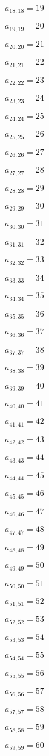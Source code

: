 \documentclass[a4paper,12pt]{article}
\begin{document}
$a _{ 18, 18 } = 19$

$a _{ 19, 19 } = 20$

$a _{ 20, 20 } = 21$

$a _{ 21, 21 } = 22$

$a _{ 22, 22 } = 23$

$a _{ 23, 23 } = 24$

$a _{ 24, 24 } = 25$

$a _{ 25, 25 } = 26$

$a _{ 26, 26 } = 27$

$a _{ 27, 27 } = 28$

$a _{ 28, 28 } = 29$

$a _{ 29, 29 } = 30$

$a _{ 30, 30 } = 31$

$a _{ 31, 31 } = 32$

$a _{ 32, 32 } = 33$

$a _{ 33, 33 } = 34$

$a _{ 34, 34 } = 35$

$a _{ 35, 35 } = 36$

$a _{ 36, 36 } = 37$

$a _{ 37, 37 } = 38$

$a _{ 38, 38 } = 39$

$a _{ 39, 39 } = 40$

$a _{ 40, 40 } = 41$

$a _{ 41, 41 } = 42$

$a _{ 42, 42 } = 43$

$a _{ 43, 43 } = 44$

$a _{ 44, 44 } = 45$

$a _{ 45, 45 } = 46$

$a _{ 46, 46 } = 47$

$a _{ 47, 47 } = 48$

$a _{ 48, 48 } = 49$

$a _{ 49, 49 } = 50$

$a _{ 50, 50 } = 51$

$a _{ 51, 51 } = 52$

$a _{ 52, 52 } = 53$

$a _{ 53, 53 } = 54$

$a _{ 54, 54 } = 55$

$a _{ 55, 55 } = 56$

$a _{ 56, 56 } = 57$

$a _{ 57, 57 } = 58$

$a _{ 58, 58 } = 59$

$a _{ 59, 59 } = 60$
\end{document}
